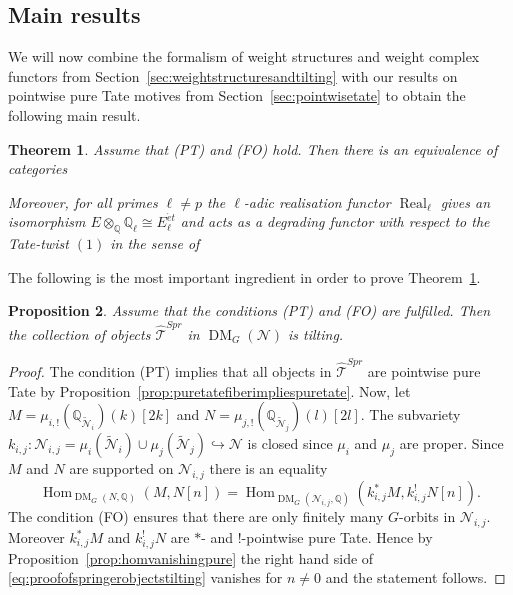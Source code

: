 \documentclass{amsart}
\theoremstyle{plain}
\newtheorem{theorem}{Theorem}[section]
\newtheorem{proposition}[theorem]{Proposition}
\theoremstyle{TheoremNum}
\theoremstyle{definition}
\theoremstyle{remark}
\numberwithin{equation}{section}
\newcommand{\Q}{\mathbb{Q}}
\newcommand{\Z}{\mathbb{Z}}
\newcommand{\M}{\widetilde{\mathcal{N}}}
\newcommand{\N}{\mathcal{N}}
\newcommand{\Tt}{\mathcal{T}}
\newcommand{\D}{\operatorname{D}}
\newcommand{\DM}{\operatorname{DM}}
\newcommand{\DperfZ}{\operatorname{D}^\Z_{\operatorname{perf}}}
\newcommand{\Hom}{\operatorname{Hom}}
\newcommand{\Real}{\operatorname{Real}}
\begin{document}
\subsection{Main results}
We will now combine the formalism of weight structures and weight complex functors from Section~\ref{sec:weightstructuresandtilting} with our results on pointwise pure Tate motives from Section~\ref{sec:pointwisetate} to obtain the following main result.
\begin{theorem}\label{thm:main}
Assume that (PT) and (FO) hold. Then there is an equivalence of categories
\begin{center}
\end{center}
Moreover, for all primes $\ell\neq p$ the $\ell$-adic realisation functor $\Real_\ell$ gives an isomorphism $E\otimes_\Q\Q_\ell\cong E^{\acute{e}t}_\ell$ and acts as a degrading functor with respect to the Tate-twist $(1)$ in the sense of \cite{beilinson_koszul_1996}
\begin{center}
\end{center}
\end{theorem}
The following is the most important ingredient in order to prove Theorem~\ref{thm:main}.
\begin{proposition}\label{prop:springerobjectstilting} Assume that the conditions (PT) and (FO) are fulfilled. Then the collection of objects $\widehat{\Tt}^{Spr}$ in $\DM_G(\N)$ is tilting.
\end{proposition}
\begin{proof}
The condition (PT) implies that all objects in $\widehat{\Tt}^{Spr}$ are pointwise pure Tate by Proposition~\ref{prop:puretatefiberimpliespuretate}. 
Now, let $M=\mu_{i,!}(\Q_{\M_i})(k)[2k]$ and $N=\mu_{j,!}(\Q_{\M_j})(l)[2l].$
The subvariety $k_{i,j}: \N_{i,j}=\mu_i(\M_i)\cup\mu_j(\M_j)\hookrightarrow \N$ is closed since $\mu_i$ and $\mu_j$ are proper. Since $M$ and $N$ are supported on $\N_{i,j}$ there is an equality
\begin{equation}\label{eq:proofofspringerobjectstilting}
    \Hom_{\DM_G(N,\Q)}(M,N[n])=\Hom_{\DM_G(\N_{i,j},\Q)}(k_{i,j}^*M,k_{i,j}^!N[n]).
\end{equation}
The condition (FO) ensures that there are only finitely many $G$-orbits in $\N_{i,j}.$ Moreover $k_{i,j}^*M$ and $k_{i,j}^!N$ are $*$- and $!$-pointwise pure Tate. Hence by Proposition~\ref{prop:homvanishingpure} the right hand side of \eqref{eq:proofofspringerobjectstilting} vanishes for $n\neq 0$ and the statement follows.
\end{proof}
\end{document}
